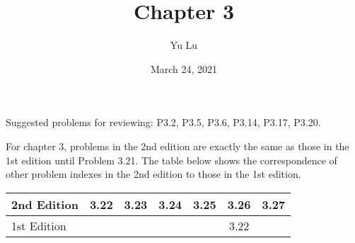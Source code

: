 \documentclass{article}
\title{Chapter 3}
\date{March 24, 2021}
\author{Yu Lu}
\begin{document}
\newcommand{\rot}[1]{\hat{R}(\phi \hat{#1})} %
\newcommand{\rott}[2]{\hat{R}(#1 \hat{#2})} %

\maketitle
Suggested problems for reviewing: P3.2, P3.5, P3.6, P3.14, P3.17, P3.20. 

For chapter 3, problems in the 2nd edition are exactly the same as those in the 1st edition until Problem 3.21. The table below shows the correspondence of other problem indexes in the 2nd edition to those in the 1st edition. 

\begin{table}[h!]
    \begin{center}
      \begin{tabular}{l|c|c|c|c|c|c} 
        \hline
        2nd Edition
        &3.22
        &3.23
        &3.24
        &3.25
        &3.26
        &3.27
        \\ \hline
        1st Edition
        &        
        &
        &
        &
        &3.22
        &
        \\ \hline
      \end{tabular}
    \end{center}
\end{table}
\end{document}

